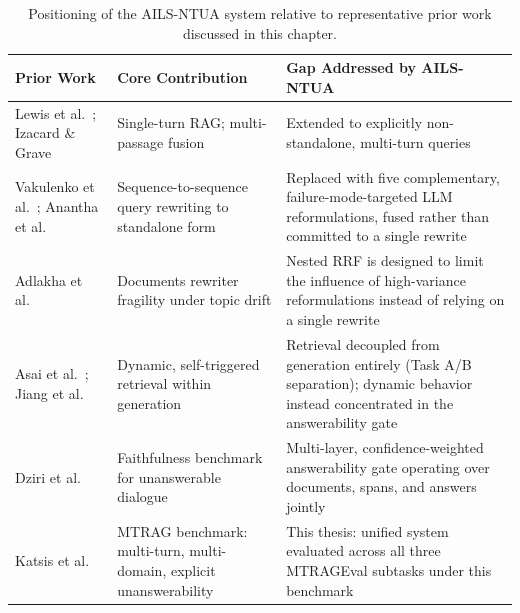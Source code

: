 \begin{table}[h]
\centering
\small
\begin{tabular}{p{3.1cm}p{4.3cm}p{5.5cm}}
\toprule
\textbf{Prior Work} & \textbf{Core Contribution} & \textbf{Gap Addressed by AILS-NTUA} \\
\midrule
Lewis et al.\ \citep{lewis2020retrieval}; Izacard \& Grave \citep{izacard2021leveraging} & Single-turn RAG; multi-passage fusion & Extended to explicitly non-standalone, multi-turn queries \\
Vakulenko et al.\ \citep{vakulenko2021question}; Anantha et al.\ \citep{anantha2021open} & Sequence-to-sequence query rewriting to standalone form & Replaced with five complementary, failure-mode-targeted LLM reformulations, fused rather than committed to a single rewrite \\
Adlakha et al.\ \citep{adlakha2022topiocqa} & Documents rewriter fragility under topic drift & Nested RRF is designed to limit the influence of high-variance reformulations instead of relying on a single rewrite \\
Asai et al.\ \citep{asai2024selfrag}; Jiang et al.\ \citep{jiang2023active} & Dynamic, self-triggered retrieval within generation & Retrieval decoupled from generation entirely (Task A/B separation); dynamic behavior instead concentrated in the answerability gate \\
Dziri et al.\ \citep{dziri2022faithdial} & Faithfulness benchmark for unanswerable dialogue & Multi-layer, confidence-weighted answerability gate operating over documents, spans, and answers jointly \\
Katsis et al.\ \citep{katsis2025mtrag} & MTRAG benchmark: multi-turn, multi-domain, explicit unanswerability & This thesis: unified system evaluated across all three MTRAGEval subtasks under this benchmark \\
\bottomrule
\end{tabular}
\caption{Positioning of the AILS-NTUA system relative to representative prior work discussed in this chapter.}
\label{tab:related-work-summary}
\end{table}